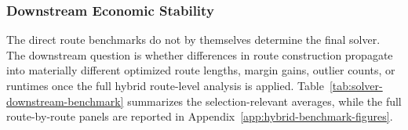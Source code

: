 \documentclass[preprint,12pt]{elsarticle}
\begin{document}
\subsubsection{Downstream Economic Stability}

The direct route benchmarks do not by themselves determine the final solver. The downstream question is whether differences in route construction propagate into materially different optimized route lengths, margin gains, outlier counts, or runtimes once the full hybrid route-level analysis is applied. Table~\ref{tab:solver-downstream-benchmark} summarizes the selection-relevant averages, while the full route-by-route panels are reported in Appendix~\ref{app:hybrid-benchmark-figures}.

\begin{table}[htbp]
\centering
\caption{Route-level hybrid benchmark summary. Values are averages across the evaluated routes.}
\label{tab:solver-downstream-benchmark}
\end{table}
\end{document}
